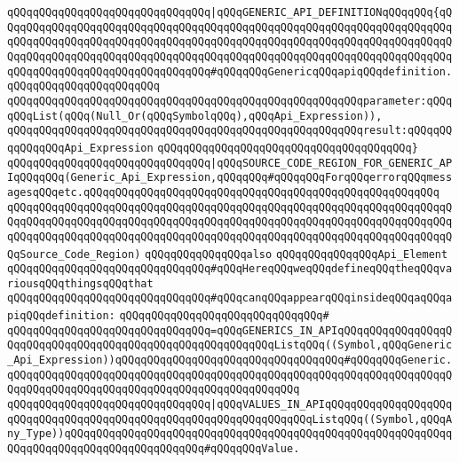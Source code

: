 \verb|qQQqqQQqqQQqqQQqqQQqqQQqqQQqqQQq|\verb#|qQQqGENERIC_API_DEFINITIONqQQqqQQq{qQQqqQQqqQQqqQQqqQQqqQQqqQQqqQQqqQQqqQQqqQQqqQQqqQQqqQQqqQQqqQQqqQQqqQQqqQQqqQQqqQQqqQQqqQQqqQQqqQQqqQQqqQQqqQQqqQQqqQQqqQQqqQQqqQQqqQQqqQQqqQQqqQQqqQQqqQQqqQQqqQQqqQQqqQQqqQQqqQQqqQQqqQQqqQQqqQQqqQQqqQQqqQQqqQQqqQQqqQQqqQQqqQQqqQQqqQQqqQQqqQQq#\verb|#qQQqqQQqGenericqQQqapiqQQqdefinition.qQQqqQQqqQQqqQQqqQQqqQQq|\newline
\verb|qQQqqQQqqQQqqQQqqQQqqQQqqQQqqQQqqQQqqQQqqQQqqQQqqQQqqQQqparameter:qQQqqQQqList(qQQq(Null_Or(qQQqSymbolqQQq),qQQqApi_Expression)),|\newline
\verb|qQQqqQQqqQQqqQQqqQQqqQQqqQQqqQQqqQQqqQQqqQQqqQQqqQQqqQQqresult:qQQqqQQqqQQqqQQqApi_Expression|\newline
\verb|qQQqqQQqqQQqqQQqqQQqqQQqqQQqqQQqqQQqqQQq}|\newline
\verb|qQQqqQQqqQQqqQQqqQQqqQQqqQQqqQQq|\verb#|qQQqSOURCE_CODE_REGION_FOR_GENERIC_APIqQQqqQQq(Generic_Api_Expression,qQQqqQQq#\verb|#qQQqqQQqForqQQqerrorqQQqmessagesqQQqetc.qQQqqQQqqQQqqQQqqQQqqQQqqQQqqQQqqQQqqQQqqQQqqQQqqQQqqQQq|\newline
\verb|qQQqqQQqqQQqqQQqqQQqqQQqqQQqqQQqqQQqqQQqqQQqqQQqqQQqqQQqqQQqqQQqqQQqqQQqqQQqqQQqqQQqqQQqqQQqqQQqqQQqqQQqqQQqqQQqqQQqqQQqqQQqqQQqqQQqqQQqqQQqqQQqqQQqqQQqqQQqqQQqqQQqqQQqqQQqqQQqqQQqqQQqqQQqqQQqqQQqqQQqqQQqqQQqqQQqSource_Code_Region)|\newline
\newline
\newline
\newline
\verb|qQQqqQQqqQQqqQQqalso|\newline
\verb|qQQqqQQqqQQqqQQqApi_Element|\newline
\newline
\verb|qQQqqQQqqQQqqQQqqQQqqQQqqQQqqQQq#qQQqHereqQQqweqQQqdefineqQQqtheqQQqvariousqQQqthingsqQQqthat|\newline
\verb|qQQqqQQqqQQqqQQqqQQqqQQqqQQqqQQq#qQQqcanqQQqappearqQQqinsideqQQqaqQQqapiqQQqdefinition:|\newline
\verb|qQQqqQQqqQQqqQQqqQQqqQQqqQQqqQQq#|\newline
\verb|qQQqqQQqqQQqqQQqqQQqqQQqqQQqqQQq=qQQqGENERICS_IN_APIqQQqqQQqqQQqqQQqqQQqqQQqqQQqqQQqqQQqqQQqqQQqqQQqqQQqqQQqqQQqListqQQq((Symbol,qQQqGeneric_Api_Expression))qQQqqQQqqQQqqQQqqQQqqQQqqQQqqQQqqQQq#qQQqqQQqGeneric.qQQqqQQqqQQqqQQqqQQqqQQqqQQqqQQqqQQqqQQqqQQqqQQqqQQqqQQqqQQqqQQqqQQqqQQqqQQqqQQqqQQqqQQqqQQqqQQqqQQqqQQqqQQqqQQqqQQq|\newline
\verb|qQQqqQQqqQQqqQQqqQQqqQQqqQQqqQQq|\verb#|qQQqVALUES_IN_APIqQQqqQQqqQQqqQQqqQQqqQQqqQQqqQQqqQQqqQQqqQQqqQQqqQQqqQQqqQQqqQQqqQQqListqQQq((Symbol,qQQqAny_Type))qQQqqQQqqQQqqQQqqQQqqQQqqQQqqQQqqQQqqQQqqQQqqQQqqQQqqQQqqQQqqQQqqQQqqQQqqQQqqQQqqQQqqQQqqQQq#\verb|#qQQqqQQqValue.|\newline
